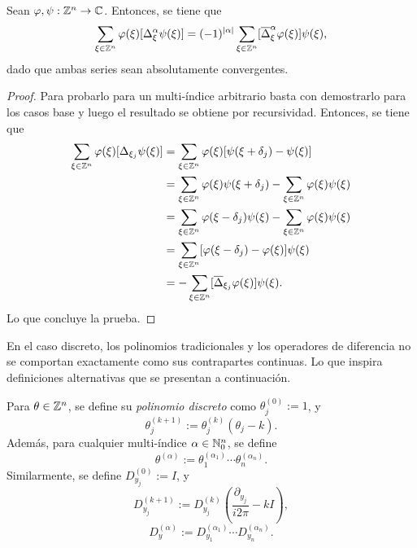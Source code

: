 \begin{proposition}
	Sean $\varphi,\psi:\mathbb{Z}^n\to\mathbb{C}$. Entonces, se tiene que 
	\begin{equation*}
		\sum_{\xi\in\mathbb{Z}^n}\varphi(\xi) [\Delta^\alpha_\xi\psi(\xi)] = (-1)^{|\alpha|}\sum_{\xi\in\mathbb{Z}^n} [\overline{\Delta}^\alpha_\xi\varphi(\xi)]\psi(\xi),
	\end{equation*}
	dado que ambas series sean absolutamente convergentes.
\end{proposition}
\begin{proof}
	Para probarlo para un multi-índice arbitrario basta con demostrarlo para los casos base y luego el resultado se obtiene por recursividad. Entonces, se tiene que 
	\begin{align*}
		\sum_{\xi\in\mathbb{Z}^n}\varphi(\xi) [\Delta_{\xi_j}\psi(\xi)] & = \sum_{\xi\in\mathbb{Z}^n}\varphi(\xi) [\psi(\xi+\delta_j) - \psi(\xi)] \\
		& = \sum_{\xi\in\mathbb{Z}^n}\varphi(\xi) \psi(\xi+\delta_j) - \sum_{\xi\in\mathbb{Z}^n}\varphi(\xi) \psi(\xi) \\
		& = \sum_{\xi\in\mathbb{Z}^n}\varphi(\xi-\delta_j) \psi(\xi) - \sum_{\xi\in\mathbb{Z}^n}\varphi(\xi) \psi(\xi) \\
		& = \sum_{\xi\in\mathbb{Z}^n}[\varphi(\xi-\delta_j) - \varphi(\xi)]\psi(\xi) \\
		& = -\sum_{\xi\in\mathbb{Z}^n} [\overline{\Delta}_{\xi_j}\varphi(\xi)]\psi(\xi).
	\end{align*}
	Lo que concluye la prueba.
\end{proof}
En el caso discreto, los polinomios tradicionales y los operadores de diferencia no se comportan exactamente como sus contrapartes continuas. Lo que inspira definiciones alternativas que se presentan a continuación.
\begin{definition}
	Para $\theta\in\mathbb{Z}^n$, se define su \textit{polinomio discreto} como $\theta^{(0)}_j := 1$, y
	\begin{equation*}
		\theta^{(k+1)}_j := \theta^{(k)}_j(\theta_j-k).
	\end{equation*}
	Además, para cualquier multi-índice $\alpha\in\mathbb{N}_0^n$, se define
	\begin{equation*}
		\theta^{(\alpha)} := \theta^{(\alpha_1)}_1 \cdots \theta^{(\alpha_n)}_n.
	\end{equation*}
	Similarmente, se define $D_{y_j}^{(0)} := I$, y 
	\begin{equation*}
		D_{y_j}^{(k+1)} := D_{y_j}^{(k)} \left(\frac{\partial_{y_j}}{i2\pi}-kI\right),
	\end{equation*}
	\begin{equation*}
		D^{(\alpha)}_y := D^{(\alpha_1)}_{y_1} \cdots D^{(\alpha_n)}_{y_n}.
	\end{equation*}
\end{definition}
